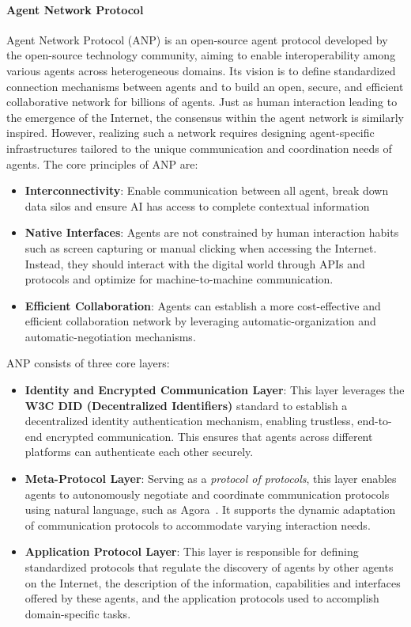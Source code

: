 \documentclass[10pt,preprint]{article}
\begin{document}
\paragraph{Agent Network Protocol~\citep{anp2024}} Agent Network Protocol (ANP)  is an open-source agent protocol developed by the open-source technology community, aiming to enable interoperability among various agents across heterogeneous domains. Its vision is to define standardized connection mechanisms between agents and to build an open, secure, and efficient collaborative network for billions of agents. Just as human interaction leading to the emergence of the Internet, the consensus within the agent network is similarly inspired. However, realizing such a network requires designing agent-specific infrastructures tailored to the unique communication and coordination needs of agents. The core principles of ANP are:
\begin{itemize}
  \item \textbf{Interconnectivity}: Enable communication between all agent, break down data silos and ensure AI has access to complete contextual information
  \item \textbf{Native Interfaces}: Agents are not constrained by human interaction habits such as screen capturing or manual clicking when accessing the Internet. Instead, they should interact with the digital world through APIs and protocols and optimize for machine-to-machine communication.
  \item \textbf{Efficient Collaboration}: Agents can establish a more cost-effective and efficient collaboration network by leveraging automatic-organization and automatic-negotiation mechanisms.
\end{itemize}

ANP consists of three core layers:
\begin{itemize}
    \item \textbf{Identity and Encrypted Communication Layer}: This layer leverages the \textbf{W3C DID (Decentralized Identifiers)} standard to establish a decentralized identity authentication mechanism, enabling trustless, end-to-end encrypted communication. This ensures that agents across different platforms can authenticate each other securely.
    \item \textbf{Meta-Protocol Layer}: Serving as a \textit{protocol of protocols}, this layer enables agents to autonomously negotiate and coordinate communication protocols using natural language, such as Agora~\citep{marro2024scalablecommunicationprotocolnetworks}. It supports the dynamic adaptation of communication protocols to accommodate varying interaction needs.
    \item \textbf{Application Protocol Layer}: This layer is responsible for defining standardized protocols that regulate the discovery of agents by other agents on the Internet, the description of the information, capabilities and interfaces offered by these agents, and the application protocols used to accomplish domain-specific tasks.
\end{itemize}
\end{document}
